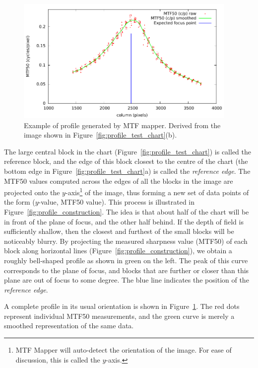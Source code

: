 \documentclass[a4paper]{article}
\begin{document}
\begin{figure}
\centering
\includegraphics[width=0.95\textwidth]{figures/sample_profile}
\caption{Example of profile generated by MTF mapper. Derived from the image
shown in Figure~\ref{fig:profile_test_chart}(b).}
\label{fig:sample_profile}
\end{figure}

The large central block in the chart (Figure~\ref{fig:profile_test_chart}) 
is called the reference block, and the edge of this block closest to the
centre of the chart (the bottom edge in Figure~\ref{fig:profile_test_chart}a)
is called the \emph{reference edge}.
The MTF50 values computed across the edges of all the blocks in the image
are projected onto the $y$-axis\footnote{MTF Mapper will auto-detect the
orientation of the image. For ease of discussion, this is called the
$y$-axis.} of the image, thus forming a new set of data
points of the form ($y$-value, MTF50 value). This process is illustrated in
Figure~\ref{fig:profile_construction}. The idea is that about half of the
chart will be in front of the plane of focus, and the other half behind. If
the depth of field is sufficiently shallow, then the closest and furthest of
the small blocks will be noticeably blurry. By projecting the measured
sharpness value (MTF50) of each block along horizontal lines
(Figure~\ref{fig:profile_construction}), we obtain a roughly bell-shaped
profile as shown in green on the left. The peak of this curve corresponds to the plane
of focus, and blocks that are further or closer than this plane are out of
focus to some degree. The blue line indicates the position of the
\emph{reference edge}.

A complete profile in its usual orientation is shown in 
Figure~\ref{fig:sample_profile}. The red dots represent individual MTF50
measurements, and the green curve is merely a smoothed representation of the
same data.
\end{document}
